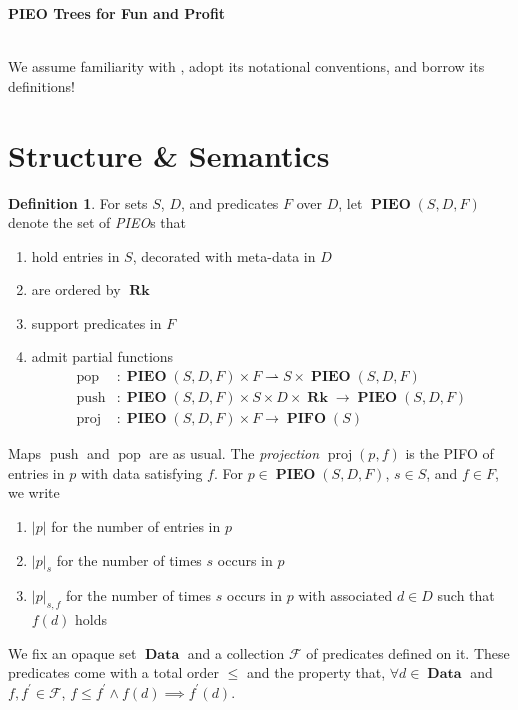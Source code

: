 \documentclass{amsart}
\DeclareMathOperator{\halfto}{\rightharpoonup}
\DeclareMathOperator{\push}{\mathrm{push}}
\DeclareMathOperator{\pop}{\mathrm{pop}}
\DeclareMathOperator{\proj}{\mathrm{proj}}
\DeclareMathOperator{\Rk}{\mathbf{Rk}}
\DeclareMathOperator{\Data}{\mathbf{Data}}
\DeclareMathOperator{\PIEO}{\mathbf{PIEO}}
\DeclareMathOperator{\PIFO}{\mathbf{PIFO}}
\theoremstyle{definition}
\newtheorem{dfn}[thm]{Definition}
\begin{document}
\pagestyle{empty}

{\LARGE \textbf{PIEO Trees for Fun and Profit}}

\hrulefill\\

We assume familiarity with \cite{OG}, adopt its notational conventions, and borrow its definitions!

\section{Structure \& Semantics}

\begin{dfn}
    For sets $S$, $D$, and predicates $F$ over $D$,
    let $\PIEO(S, D, F)$ denote the set of \emph{PIEO}s that
    \begin{enumerate}
        \item hold entries in $S$, decorated with meta-data in $D$
        \item are ordered by $\Rk$
        \item support predicates in $F$
        \item admit partial functions 
        \begin{align*}
            \pop &: \PIEO(S, D, F) \times F \halfto S \times \PIEO(S, D, F) \\
            \push &: \PIEO(S, D, F) \times S \times D \times \Rk \to \PIEO(S, D, F) \\
            \proj &: \PIEO(S, D, F) \times F \to \PIFO(S)
        \end{align*}
    \end{enumerate}
    Maps $\push$ and $\pop$ are as usual.
    The \emph{projection} $\proj(p, f)$ is the PIFO of entries in $p$ with data satisfying $f$.
    For $p \in \PIEO(S, D, F)$, $s \in S$, and $f \in F$, we write 
    \begin{enumerate}
        \item $|p|$ for the number of entries in $p$
        \item $|p|_{s}$ for the number of times $s$ occurs in $p$
        \item $|p|_{s,f}$ for the number of times $s$ occurs in $p$ with associated $d \in D$ such that $f(d)$ holds
    \end{enumerate}
\end{dfn}

We fix an opaque set $\Data$ and a collection $\mathcal F$ of predicates defined on it.
These predicates come with a total order $\leq$ and the property that, $\forall d \in \Data$ and $f,f^\prime \in \mathcal F$,
$f \leq f^\prime \land f(d) \implies f^\prime(d)$.
\end{document}
